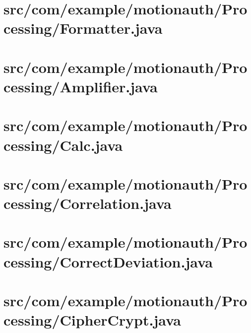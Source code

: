 \documentclass[11pt]{jreport}
\renewcommand{\slash}{/}
\begin{document}
    \section{src\slash com\slash example\slash motionauth\slash Processing\slash Formatter.java}
    

    \section{src\slash com\slash example\slash motionauth\slash Processing\slash Amplifier.java}
    

    \section{src\slash com\slash example\slash motionauth\slash Processing\slash Calc.java}
    

    \section{src\slash com\slash example\slash motionauth\slash Processing\slash Correlation.java}
    

    \section{src\slash com\slash example\slash motionauth\slash Processing\slash CorrectDeviation.java}
    

    \section{src\slash com\slash example\slash motionauth\slash Processing\slash CipherCrypt.java}
    
\end{document}
